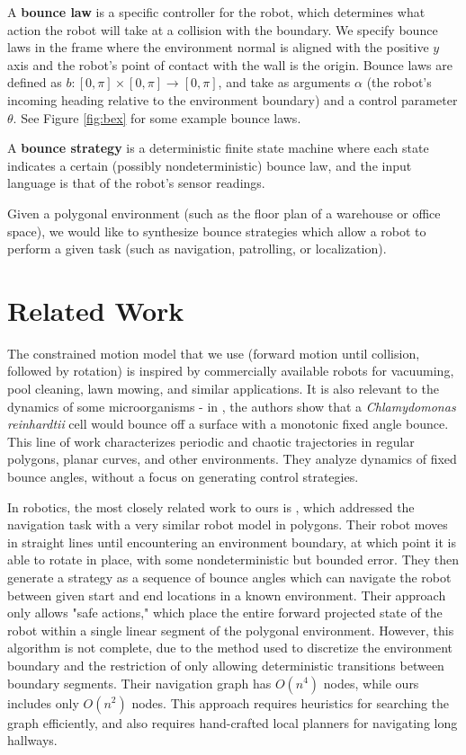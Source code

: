 \documentclass[]{styles/svproc}  %
\begin{document}
\begin{definition}
A \textbf{bounce law} is a specific controller for the robot, which determines
what action the robot will take at a collision with the boundary.
We specify 
bounce laws in the
frame where the environment normal is aligned with the positive $y$ axis and the
robot's point of contact with the wall is the origin.  
Bounce laws are defined as $b: [0,\pi] \times [0,\pi] \to [0,\pi]$, and take as
arguments $\alpha$ (the robot's incoming heading relative to the environment
boundary) and a control parameter $\theta$. See Figure \ref{fig:bex} for some
example bounce laws. 
\end{definition}

\begin{definition}
A \textbf{bounce strategy} is a deterministic finite state machine where each
state indicates a certain (possibly nondeterministic) bounce law, and the input language is that of the
robot's sensor readings.
\end{definition}

Given a polygonal environment (such as the floor plan of a warehouse or office
space), we would like to synthesize bounce strategies which allow a robot to
perform a given task (such as navigation, patrolling, or localization).

\section{Related Work}

The constrained motion model that we use (forward motion until collision,
followed by rotation) is inspired by commercially available robots
for vacuuming, pool cleaning, lawn mowing, and similar applications. It is also
 relevant to the dynamics of some microorganisms - in \cite{microorganism2017}, the authors show that a
\textit{Chlamydomonas reinhardtii} cell would bounce off a surface with a
monotonic fixed angle bounce. This line of work characterizes periodic and
chaotic trajectories in regular polygons, planar curves, and other environments.
They analyze dynamics of fixed bounce angles, without a focus on generating control
strategies.

In robotics, the most closely related work to ours is \cite{LewOKa13}, which addressed 
the navigation task with a very similar robot
model in polygons. Their robot moves in straight lines until encountering an environment
boundary, at which point it is able to rotate in place, with some nondeterministic but
bounded error. They then generate a strategy as a sequence of bounce angles which can 
navigate the robot between given start and end locations in a known environment. Their approach only allows "safe actions," which place
the entire forward projected state of the robot within a single
linear segment of the polygonal environment. However, this algorithm is
not complete, due to the method used to discretize the environment boundary and
the restriction of only allowing deterministic transitions between boundary
segments. Their navigation graph has $O(n^4)$ nodes, while ours includes only $O(n^2)$
nodes. This approach requires heuristics for searching the graph efficiently,
and also requires hand-crafted local planners for navigating long hallways.
\end{document}
